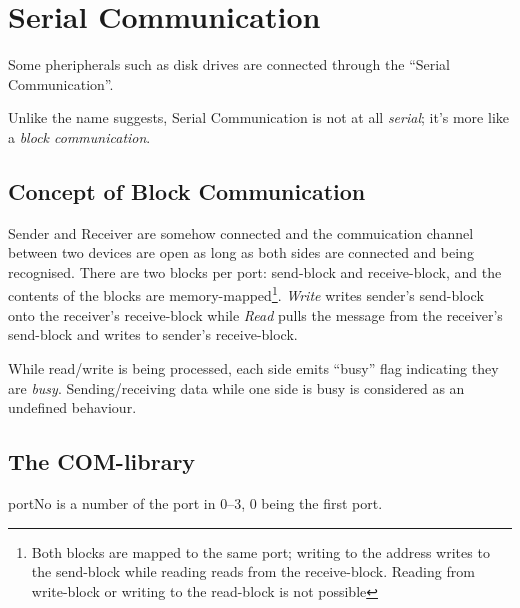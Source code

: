 \chapter{Serial Communication}

Some pheripherals such as disk drives are connected through the ``Serial Communication''.

Unlike the name suggests, Serial Communication is not at all \emph{serial}; it's more like a \emph{block communication}.

\section{Concept of Block Communication}

Sender and Receiver are somehow connected and the commuication channel between two devices are open as long as both sides are connected and being recognised. There are two blocks per port: send-block and receive-block, and the contents of the blocks are memory-mapped\footnote{Both blocks are mapped to the same port; writing to the address writes to the send-block while reading reads from the receive-block. Reading from write-block or writing to the read-block is not possible}. \emph{Write} writes sender's send-block onto the receiver's receive-block while \emph{Read} pulls the message from the receiver's send-block and writes to sender's receive-block.

While read/write is being processed, each side emits ``busy'' flag indicating they are \emph{busy}. Sending/receiving data while one side is busy is considered as an undefined behaviour.


\section{The COM-library}

portNo is a number of the port in 0--3, 0 being the first port.

